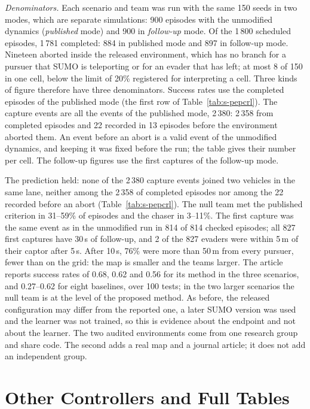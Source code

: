 \documentclass[preprint,12pt]{elsarticle}
\begin{document}
\emph{Denominators.} Each scenario and team was run with the same 150 seeds in two modes, which are separate
simulations: 900 episodes with the unmodified dynamics (\emph{published} mode) and 900 in \emph{follow-up} mode. Of
the 1\,800 scheduled episodes, 1\,781 completed: 884 in published mode and 897 in follow-up mode. Nineteen aborted
inside the released environment, which has no branch for a pursuer that SUMO is teleporting or for an evader that
has left; at most 8 of 150 in one cell, below the limit of 20\% registered for interpreting a cell. Three kinds of
figure therefore have three denominators. Success rates use the completed episodes of the published mode (the first
row of Table~\ref{tab:s-pepcrl}). The capture events are all the events of the published mode, 2\,380: 2\,358 from
completed episodes and 22 recorded in 13 episodes before the environment aborted them. An event before an abort is
a valid event of the unmodified dynamics, and keeping it was fixed before the run; the table gives their number per
cell. The follow-up figures use the first captures of the follow-up mode.

The prediction held: none of the 2\,380 capture events joined two vehicles in the same lane, neither among the
2\,358 of completed episodes nor among the 22 recorded before an abort (Table~\ref{tab:s-pepcrl}). The null team met the published criterion in 31--59\% of
episodes and the chaser in 3--11\%. The first capture was the same event as in the unmodified run in 814 of 814
checked episodes; all 827 first captures have 30\,s of follow-up, and 2 of the 827 evaders were within 5\,m of their
captor after 5\,s. After 10\,s, 76\% were more than 50\,m from every pursuer, fewer than on the grid: the map is
smaller and the teams larger. The article reports success rates of 0.68, 0.62 and 0.56 for its method in the three
scenarios, and 0.27--0.62 for eight baselines, over 100 tests; in the two larger scenarios the null team is at the
level of the proposed method. As before, the released configuration may differ from the reported one, a later SUMO
version was used and the learner was not trained, so this is evidence about the endpoint and not about the learner.
The two audited environments come from one research group and share code. The second adds a real map and a journal
article; it does not add an independent group.

\section{Other Controllers and Full Tables}\label{sec:s-controllers}
\end{document}
